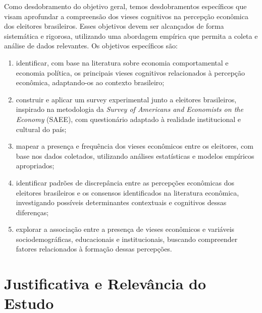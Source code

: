 
Como desdobramento do objetivo geral, temos desdobramentos específicos que visam aprofundar a compreensão dos vieses cognitivos na percepção econômica dos eleitores brasileiros. Esses objetivos devem ser alcançados de forma sistemática e rigorosa, utilizando uma abordagem empírica que permita a coleta e análise de dados relevantes. Os objetivos específicos são:

\begin{enumerate}[label=\alph*)]
    \item \label{obj:a} identificar, com base na literatura sobre economia comportamental e economia política, os principais vieses cognitivos relacionados à percepção econômica, adaptando-os ao contexto brasileiro;

    \item \label{obj:b} construir e aplicar um survey experimental junto a eleitores brasileiros, inspirado na metodologia da \textit{Survey of Americans and Economists on the Economy} (SAEE), com questionário adaptado à realidade institucional e cultural do país;

    \item \label{obj:c} mapear a presença e frequência dos vieses econômicos entre os eleitores, com base nos dados coletados, utilizando análises estatísticas e modelos empíricos apropriados;

    \item \label{obj:d} identificar padrões de discrepância entre as percepções econômicas dos eleitores brasileiros e os consensos identificados na literatura econômica, investigando possíveis determinantes contextuais e cognitivos dessas diferenças;

    \item \label{obj:e} explorar a associação entre a presença de vieses econômicos e variáveis sociodemográficas, educacionais e institucionais, buscando compreender fatores relacionados à formação dessas percepções.
\end{enumerate}


\section{Justificativa e Relevância do Estudo}


